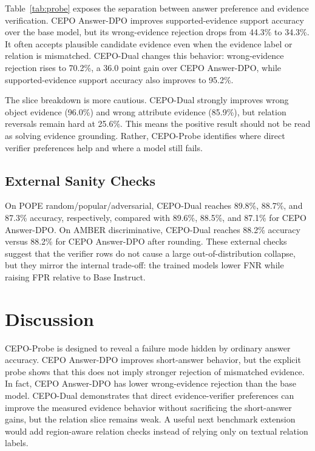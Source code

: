 \documentclass[10pt,twocolumn,letterpaper]{article}
\newcommand{\benchmark}{CEPO-Probe}
\newcommand{\answerdpo}{CEPO Answer-DPO}
\newcommand{\cepodual}{CEPO-Dual}
\begin{document}
Table~\ref{tab:probe} exposes the separation between answer preference and
evidence verification. \answerdpo{} improves supported-evidence support
accuracy over the base model, but its wrong-evidence rejection drops from
44.3\% to 34.3\%. It often accepts plausible candidate evidence even when the
evidence label or relation is mismatched. \cepodual{} changes this behavior:
wrong-evidence rejection rises to 70.2\%, a 36.0 point gain over \answerdpo{},
while supported-evidence support accuracy also improves to 95.2\%.

The slice breakdown is more cautious. \cepodual{} strongly improves wrong
object evidence (96.0\%) and wrong attribute evidence (85.9\%), but relation
reversals remain hard at 25.6\%. This means the positive result should not be
read as solving evidence grounding. Rather, \benchmark{} identifies where
direct verifier preferences help and where a model still fails.

\subsection{External Sanity Checks}

On POPE random/popular/adversarial, \cepodual{} reaches 89.8\%, 88.7\%, and
87.3\% accuracy, respectively, compared with 89.6\%, 88.5\%, and 87.1\% for
\answerdpo{}. On AMBER discriminative, \cepodual{} reaches 88.2\% accuracy
versus 88.2\% for \answerdpo{} after rounding. These external checks suggest
that the verifier rows do not cause a large out-of-distribution collapse, but
they mirror the internal trade-off: the trained models lower FNR while raising
FPR relative to Base Instruct.

\section{Discussion}

\benchmark{} is designed to reveal a failure mode hidden by ordinary answer
accuracy. \answerdpo{} improves short-answer behavior, but the explicit probe
shows that this does not imply stronger rejection of mismatched evidence. In
fact, \answerdpo{} has lower wrong-evidence rejection than the base model.
\cepodual{} demonstrates that direct evidence-verifier preferences can improve
the measured evidence behavior without sacrificing the short-answer gains, but
the relation slice remains weak. A useful next benchmark extension would add
region-aware relation checks instead of relying only on textual relation
labels.
\end{document}
